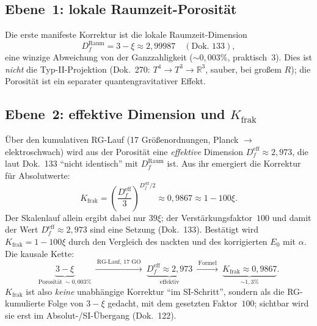 \subsection{Ebene~1: lokale Raumzeit-Porosit\"at}
Die erste manifeste Korrektur ist die lokale Raumzeit-Dimension
\[
D_f^{\text{Raum}}=3-\xi\approx 2{,}99987\quad(\text{Dok.~133}),
\]
eine winzige Abweichung von der Ganzzahligkeit ($\sim0{,}003\%$, praktisch~$3$). Dies ist
\emph{nicht} die Typ-II-Projektion (Dok.~270: $T^4\to T^3\to\mathbb{R}^3$, sauber, bei gro\ss em $R$);
die Porosit\"at ist ein separater quantengravitativer Effekt.

\subsection{Ebene~2: effektive Dimension und $K_{\text{frak}}$}
\"Uber den kumulativen RG-Lauf (17 Gr\"o\ss enordnungen, Planck $\to$ elektroschwach) wird aus der
Porosit\"at eine \emph{effektive} Dimension $D_f^{\text{eff}}\approx2{,}973$, die laut Dok.~133
\enquote{nicht identisch} mit $D_f^{\text{Raum}}$ ist. Aus ihr emergiert die Korrektur f\"ur
Absolutwerte:
\[
K_{\text{frak}}=\left(\frac{D_f^{\text{eff}}}{3}\right)^{\!D_f^{\text{eff}}/2}\approx 0{,}9867
\approx 1-100\xi .
\]
Der Skalenlauf allein ergibt dabei nur $39\xi$; der Verst\"arkungsfaktor~$100$ und damit der Wert
$D_f^{\text{eff}}\approx2{,}973$ sind eine Setzung (Dok.~133). Best\"atigt wird $K_{\text{frak}}=1-100\xi$
durch den Vergleich des nackten und des korrigierten $E_0$ mit $\alpha$. Die kausale Kette:
\[
\underbrace{3-\xi}_{\text{Porosit\"at}\ \sim0{,}003\%}\ \xrightarrow{\ \text{RG-Lauf, 17 GO}\ }\
\underbrace{D_f^{\text{eff}}\approx2{,}973}_{\text{effektiv}}\ \xrightarrow{\ \text{Formel}\ }\
\underbrace{K_{\text{frak}}\approx0{,}9867}_{\sim1{,}3\%}.
\]
$K_{\text{frak}}$ ist also \emph{keine} unabh\"angige Korrektur \enquote{im SI-Schritt}, sondern als die
RG-kumulierte Folge von $3-\xi$ gedacht, mit dem gesetzten Faktor~$100$; sichtbar wird sie erst im Absolut-/SI-\"Ubergang (Dok.~122).

